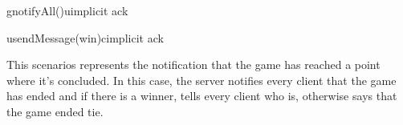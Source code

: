 \documentclass[a4paper]{article}
\begin{document}
	\begin{center}
		\begin{sequencediagram}

			\begin{call}{g}{notifyAll()}{u}{implicit ack}
				\begin{call}{u}{sendMessage(win)}{c}{implicit ack}
				\end{call}
			\end{call}
		\end{sequencediagram}
	\end{center}

	This scenarios represents the notification that the game has reached a point where it's concluded. In this case, the server notifies every client that the game has ended and if there is a winner, tells every client who is, otherwise says that the game ended tie.
\end{document}
